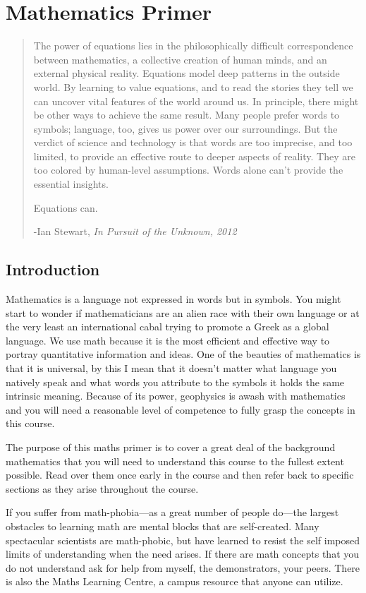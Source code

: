 \chapter{Mathematics Primer}

\begin{quote}The power of equations lies in the philosophically difficult correspondence between mathematics, a collective creation of human minds, and an external physical reality.  Equations model deep patterns in the outside world.  By learning to value equations, and to read the stories they tell we can uncover vital features of the world around us.  In principle, there might be other ways to achieve the same result.  Many people prefer words to symbols; language, too, gives us power over our surroundings.  But the verdict of science and technology is that words are too imprecise, and too limited, to provide an effective route to deeper aspects of reality.  They are too colored by human-level assumptions.  Words alone can't provide the essential insights.

Equations can.

-Ian Stewart, {\it In Pursuit of the Unknown, 2012}
\end{quote}


\section{Introduction}

Mathematics is a language not expressed in words but in symbols.  You might
start to wonder if mathematicians are an alien race with their own language or
at the very least an international cabal trying to promote a Greek as a global
language.  We use math because it is the most efficient and effective way to
portray quantitative information and ideas.  One of the beauties of mathematics
is that it is universal, by this I mean that it doesn't matter what language you
natively speak and what words you attribute to the symbols it holds the same
intrinsic meaning.  Because of its power, geophysics is awash with mathematics
and you will need a reasonable level of competence to fully grasp the concepts
in this course.

The purpose of this maths primer is to cover a great deal of the background
mathematics that you will need to understand this course to the fullest extent
possible.  Read over them once early in the course and then refer back to
specific sections as they arise throughout the course. 

If you suffer from math-phobia---as a great number of people do---the largest
obstacles to learning math are mental blocks that are self-created.  Many
spectacular scientists are math-phobic, but have learned to resist the self
imposed limits of understanding when the need arises.  If there are math
concepts that you do not understand ask for help from myself, the demonstrators,
your peers.  There is also the Maths Learning Centre, a campus resource that
anyone can utilize.


